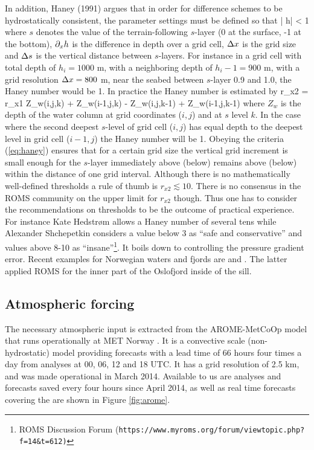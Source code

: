 In addition, Haney (1991) argues that in order for difference schemes to be hydrostatically
consistent, the parameter settings must be defined so that
\be
\label{eq:haney}
 \left|  \px h\right|\frac{\Dx}{\Ds} < 1
\ee
where $s$ denotes the value of the terrain-following $s$-layer (0 at the surface, -1 at the bottom), $\partial_x h$ is the difference in depth over a grid cell, $\Delta x$ is the grid size and $\Delta s$ is the vertical distance between $s$-layers. For instance in a grid cell with total depth of $h_i=1000$ m, with a neighboring depth of $h_i-1=900$ m, with a grid resolution $\Delta x=800$ m, near the seabed between $s$-layer 0.9 and 1.0, the Haney number would be 1. In practice the Haney number is estimated by
\be
 r_{x2} = r_{x1}
                     {Z_w(i,j,k) + Z_w(i-1,j,k) - Z_w(i,j,k-1) + Z_w(i-1,j,k-1)}
\ee
where $Z_w$ is the depth of the water column at grid coordinates ($i,j$) and at $s$ level $k$. In the case where the second deepest $s$-level of grid cell ($i,j$) has equal depth to the deepest level in grid cell ($i-1,j$) the Haney number will be 1. Obeying the criteria (\ref{eq:haney}) ensures that for a certain grid size the vertical grid increment is small enough for the $s$-layer immediately above (below) remains above (below) within the distance of one grid interval. Although there is no mathematically well-defined thresholds a rule of thumb is $r_{x2} \lesssim 10$. There is no consensus in the ROMS community on the upper limit for $r_{x2}$ though. Thus one has to consider the recommendations on thresholds to be the outcome of practical experience. For instance Kate Hedstr{\o}m allows a Haney number of several tens while Alexander Shchepetkin considers a value below 3 as ``safe and conservative'' and values above 8-10 as ``insane''\footnote{ROMS Discussion Forum (\texttt{https://www.myroms.org/forum/viewtopic.php?f=14\&t=612)}}. It boils down to controlling the pressure gradient error. Recent examples for Norwegian waters and fjords are \cite{albre:etal:2011} and \cite{staal:roed:2016}. The latter applied ROMS for the inner part of the Oslofjord inside of the {\DR} sill. 

\subsection{Atmospheric forcing}
\label{subsec:atmos}
The necessary atmospheric input is extracted from the AROME-MetCoOp model that runs operationally at MET Norway \citep{mulle:etal:2015}. It is a convective scale (non-hydrostatic) model providing forecasts with a lead time of 66 hours four times a day from analyses at 00, 06, 12 and 18 UTC. It has a grid resolution of 2.5 km, and was made operational in March 2014. Available to us are analyses and forecasts saved every four hours since April 2014, as well as real time forecasts covering the are shown in Figure \ref{fig:arome}.


